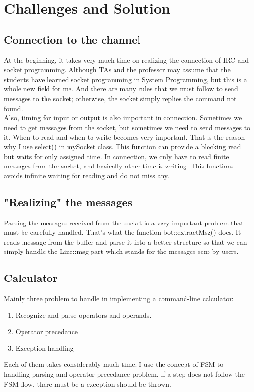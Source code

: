 \documentclass{article}
\begin{document}
\section{Challenges and Solution}
\subsection{Connection to the channel}
\indent At the beginning, it takes very much time on realizing the connection of IRC and socket programming.
Although TAs and the professor may assume that the students have learned socket programming in System Programming,
but this is a whole new field for me. And there are many rules that we must follow to send messages to the socket; 
otherwise, the socket simply replies the command not found. \\
\indent Also, timing for input or output is also important in connection.
Sometimes we need to get messages from the socket, but sometimes we need to send messages to it. When to read and when to
write becomes very important. That is the reason why I use {\cs select()} in {\cs mySocket} class. This function can provide
a blocking read but waits for only assigned time. In connection, we only have to read finite messages from the socket, and
basically other time is writing. This functions avoids infinite waiting for reading and do not miss any.
\subsection{"Realizing" the messages}
Parsing the messages received from the socket is a very important problem that must be carefully handled.
That's what the function {\cs bot::extractMsg()} does. It reads message from the buffer and parse it into a better structure
so that we can simply handle the {\cs Line::msg} part which stands for the messages sent by users.
\subsection{Calculator}
Mainly three problem to handle in implementing a command-line calculator:
\begin{enumerate}
\item Recognize and parse operators and operands.
\item Operator precedance
\item Exception handling
\end{enumerate}
Each of them takes considerably much time.
I use the concept of FSM to handling parsing and operator precedance problem. If a step does not follow the FSM flow,
there must be a exception should be thrown.
\end{document}
